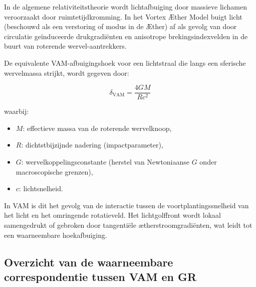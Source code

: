In de algemene relativiteitstheorie wordt lichtafbuiging door massieve lichamen veroorzaakt door ruimtetijdkromming. In het Vortex Æther Model buigt licht (beschouwd als een verstoring of modus in de Æther) af als gevolg van door circulatie geïnduceerde drukgradiënten en anisotrope brekingsindexvelden in de buurt van roterende wervel-aantrekkers.

De equivalente VAM-afbuigingshoek voor een lichtstraal die langs een sferische wervelmassa strijkt, wordt gegeven door:

\begin{equation}
    \delta_{\text{VAM}} =
    \frac{4 G M}{R c^2}
\end{equation}

waarbij:
\begin{itemize}
    \item \( M \): effectieve massa van de roterende wervelknoop,
    \item \( R \): dichtstbijzijnde nadering (impactparameter),
    \item \( G \): wervelkoppelingsconstante (herstel van Newtoniaanse \( G \) onder macroscopische grenzen),
    \item \( c \): lichtsnelheid.
\end{itemize}

In VAM is dit het gevolg van de interactie tussen de voortplantingssnelheid van het licht en het omringende rotatieveld. Het lichtgolffront wordt lokaal samengedrukt of gebroken door tangentiële ætherstroomgradiënten, wat leidt tot een waarneembare hoekafbuiging.

\subsection*{Overzicht van de waarneembare correspondentie tussen VAM en GR}

